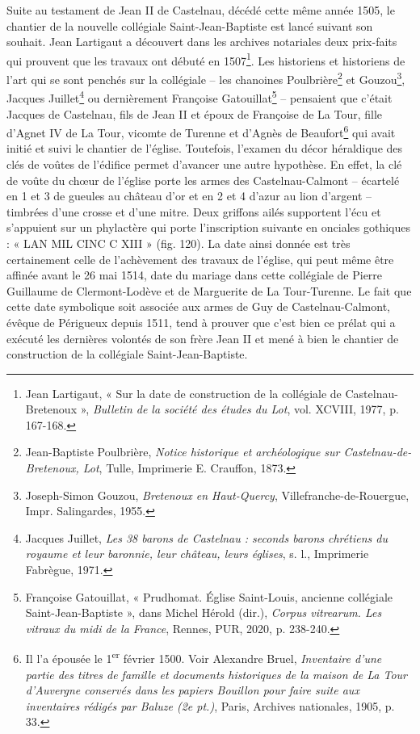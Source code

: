 \documentclass[12pt,twoside,openany]{book}
\begin{document}
Suite au testament de Jean II de Castelnau, décédé cette même année 1505, le chantier de la nouvelle collégiale Saint-Jean-Baptiste est lancé suivant son souhait. Jean Lartigaut a découvert dans les archives notariales deux prix-faits qui prouvent que les travaux ont débuté en 1507\footnote{Jean Lartigaut, « Sur la date de construction de la collégiale de Castelnau-Bretenoux », \textit{Bulletin de la société des études du Lot}, vol. XCVIII, 1977, p. 167-168.}. Les historiens et historiens de l’art qui se sont penchés sur la collégiale – les chanoines Poulbrière\footnote{Jean-Baptiste Poulbrière, \textit{Notice historique et archéologique sur Castelnau-de-Bretenoux, Lot}, Tulle, Imprimerie E. Crauffon, 1873.} et Gouzou\footnote{Joseph-Simon Gouzou, \textit{Bretenoux en Haut-Quercy}, Villefranche-de-Rouergue, Impr. Salingardes, 1955.}, Jacques Juillet\footnote{Jacques Juillet, \textit{Les 38 barons de Castelnau : seconds barons chrétiens du royaume et leur baronnie, leur château, leurs églises}, s. l., Imprimerie Fabrègue, 1971.} ou dernièrement Françoise Gatouillat\footnote{Françoise Gatouillat, « Prudhomat. Église Saint-Louis, ancienne collégiale Saint-Jean-Baptiste », dans Michel Hérold (dir.), \textit{Corpus vitrearum. Les vitraux du midi de la France}, Rennes, PUR, 2020, p. 238-240.} – pensaient que c’était Jacques de Castelnau, fils de Jean II et époux de Françoise de La Tour, fille d’Agnet IV de La Tour, vicomte de Turenne et d’Agnès de Beaufort\footnote{Il l’a épousée le 1\textsuperscript{er} février 1500. Voir Alexandre Bruel, \textit{Inventaire d'une partie des titres de famille et documents historiques de la maison de La Tour d'Auvergne conservés dans les papiers Bouillon pour faire suite aux inventaires rédigés par Baluze (2e pt.)}, Paris, Archives nationales, 1905, p. 33.} qui avait initié et suivi le chantier de l’église. Toutefois, l’examen du décor héraldique des clés de voûtes de l’édifice permet d’avancer une autre hypothèse. En effet, la clé de voûte du chœur de l’église porte les armes des Castelnau-Calmont – écartelé en 1 et 3 de gueules au château d’or et en 2 et 4 d’azur au lion d’argent – timbrées d’une crosse et d’une mitre. Deux griffons ailés supportent l’écu et s’appuient sur un phylactère qui porte l’inscription suivante en onciales gothiques : « LAN MIL CINC C XIII » (fig. 120). La date ainsi donnée est très certainement celle de l’achèvement des travaux de l’église, qui peut même être affinée avant le 26 mai 1514, date du mariage dans cette collégiale de Pierre Guillaume de Clermont-Lodève et de Marguerite de La Tour-Turenne. Le fait que cette date symbolique soit associée aux armes de Guy de Castelnau-Calmont, évêque de Périgueux depuis 1511, tend à prouver que c’est bien ce prélat qui a exécuté les dernières volontés de son frère Jean II et mené à bien le chantier de construction de la collégiale Saint-Jean-Baptiste.
\end{document}
